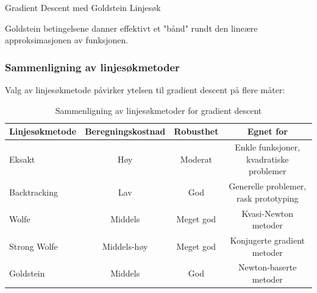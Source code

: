 \begin{algorithm}[H]
	\caption{Gradient Descent med Goldstein Linjesøk}
\end{algorithm}

Goldstein betingelsene danner effektivt et "bånd" rundt den lineære approksimasjonen av funksjonen.

\subsubsection{Sammenligning av linjesøkmetoder}
\label{subsubsec:line_search_comparison}

Valg av linjesøkmetode påvirker ytelsen til gradient descent på flere måter:

\begin{table}[H]
	\centering
	\begin{tabular}{|l|c|c|c|}
		\hline
		\textbf{Linjesøkmetode} & \textbf{Beregningskostnad} & \textbf{Robusthet} & \textbf{Egnet for}                      \\
		\hline
		Eksakt                  & Høy                        & Moderat            & Enkle funksjoner, kvadratiske problemer \\
		\hline
		Backtracking            & Lav                        & God                & Generelle problemer, rask prototyping   \\
		\hline
		Wolfe                   & Middels                    & Meget god          & Kvasi-Newton metoder                    \\
		\hline
		Strong Wolfe            & Middels-høy                & Meget god          & Konjugerte gradient metoder             \\
		\hline
		Goldstein               & Middels                    & God                & Newton-baserte metoder                  \\
		\hline
	\end{tabular}
	\caption{Sammenligning av linjesøkmetoder for gradient descent}
	\label{tab:line_search_comparison}
\end{table}

